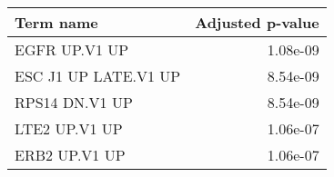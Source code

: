 \begin{tabular}{lr}
\toprule
           Term name &  Adjusted p-value \\
\midrule
       EGFR UP.V1 UP &          1.08e-09 \\
ESC J1 UP LATE.V1 UP &          8.54e-09 \\
      RPS14 DN.V1 UP &          8.54e-09 \\
       LTE2 UP.V1 UP &          1.06e-07 \\
       ERB2 UP.V1 UP &          1.06e-07 \\
\bottomrule
\end{tabular}
